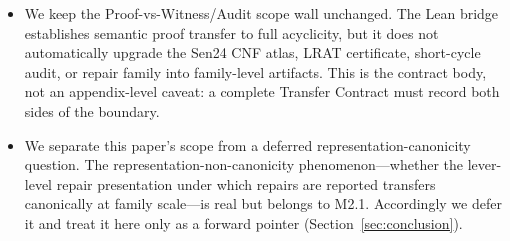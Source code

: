 \begin{itemize}[leftmargin=1.5em]
\item We keep the Proof-vs-Witness/Audit scope wall unchanged.
  The Lean bridge establishes semantic proof transfer to full acyclicity, but it does not automatically upgrade the Sen24 CNF atlas, LRAT certificate, short-cycle audit, or repair family into family-level artifacts.
  This is the contract body, not an appendix-level caveat: a complete Transfer Contract must record both sides of the boundary.

\item We separate this paper's scope from a deferred representation-canonicity question.
  The representation-non-canonicity phenomenon---whether the lever-level repair presentation under which repairs are reported transfers canonically at family scale---is real but belongs to M2.1.
  Accordingly we defer it and treat it here only as a forward pointer (Section~\ref{sec:conclusion}).
\end{itemize}
